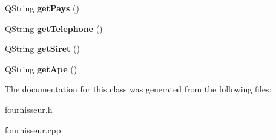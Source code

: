 \begin{DoxyCompactItemize}
Q\+String {\bfseries get\+Pays} ()
\item 
\mbox{\label{class_fournisseur_af30a747841b0e07ffe42be13ccdf9066}} 
Q\+String {\bfseries get\+Telephone} ()
\item 
\mbox{\label{class_fournisseur_a4194cdab5ed4dbcf97ac63369fa2be8d}} 
Q\+String {\bfseries get\+Siret} ()
\item 
\mbox{\label{class_fournisseur_aa85152c3305393fe49ba6a1480fcfea0}} 
Q\+String {\bfseries get\+Ape} ()
\end{DoxyCompactItemize}


The documentation for this class was generated from the following files\+:\begin{DoxyCompactItemize}
\item 
fournisseur.\+h\item 
fournisseur.\+cpp\end{DoxyCompactItemize}

